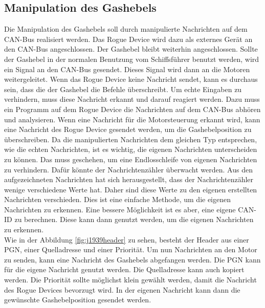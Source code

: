 \subsection{Manipulation des Gashebels} \label{sec:manipulationGashebel}
Die Manipulation des Gashebels soll durch manipulierte Nachrichten auf dem CAN-Bus realisiert werden.
Das Rogue Device wird dazu als externes Gerät an den CAN-Bus angeschlossen. Der Gashebel bleibt weiterhin angeschlossen.
Sollte der Gashebel in der normalen Benutzung vom Schiffsführer benutzt werden, wird ein Signal an den CAN-Bus gesendet. 
Dieses Signal wird dann an die Motoren weitergeleitet. Wenn das Rogue Device keine Nachricht sendet, kann es durchaus sein, dass
die der Gashebel die Befehle überschreibt.
Um echte Eingaben zu verhindern, muss diese Nachricht erkannt und darauf reagiert werden. 
Dazu muss ein Programm auf dem Rogue Device die Nachrichten auf dem CAN-Bus abhören und analysieren.
Wenn eine Nachricht für die Motorsteuerung erkannt wird, kann eine Nachricht des Rogue Device gesendet werden, um die Gashebelposition
zu überschreiben. 
Da die manipulierten Nachrichten dem gleichen Typ entsprechen, wie die echten Nachrichten, ist es wichtig, die eigenen Nachrichten
unterscheiden zu können.
Das muss geschehen, um eine Endlosschleife von eigenen Nachrichten zu verhindern. Dafür könnte
der Nachrichtenzähler überwacht werden. Aus den aufgezeichneten Nachrichten hat sich herausgestellt, dass der 
Nachrichtenzähler wenige verschiedene Werte hat. Daher sind diese Werte zu den eigenen erstellten Nachrichten 
verschieden. Dies ist eine einfache Methode, um die eigenen Nachrichten zu erkennen. Eine bessere Möglichkeit ist es aber,
eine eigene CAN-ID zu berechnen. Diese kann dann genutzt werden, um die eigenen Nachrichten zu erkennen. \\
Wie in der Abbildung \ref{fig:j1939header} zu sehen, besteht der Header aus einer PGN, einer Quelladresse und einer Priorität. Um nun Nachrichten
an den Motor zu senden, kann eine Nachricht des Gashebels abgefangen werden. Die PGN kann für die eigene Nachricht genutzt
werden. Die Quelladresse kann auch kopiert werden. Die Priorität sollte möglichst klein gewählt werden, 
damit die Nachricht des Rogue Devices bevorzugt wird. In der eigenen Nachricht kann dann die gewünschte Gashebelposition gesendet werden.

